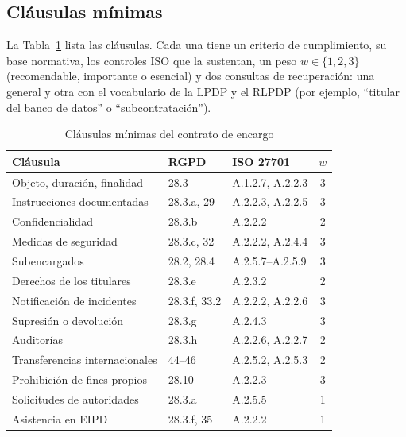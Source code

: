 \documentclass[conference]{IEEEtran}
\begin{document}
\subsection{Cláusulas mínimas}
La Tabla~\ref{tab:clausulas} lista las \NumClausulas{} cláusulas. Cada una tiene un criterio de cumplimiento, su base normativa, los controles ISO que la sustentan, un peso $w\in\{1,2,3\}$ (recomendable, importante o esencial) y dos consultas de recuperación: una general y otra con el vocabulario de la LPDP y el RLPDP (por ejemplo, ``titular del banco de datos'' o ``subcontratación'').

\begin{table}[t]
\centering
\caption{Cláusulas mínimas del contrato de encargo}
\label{tab:clausulas}
\scriptsize
\begin{tabular}{@{}p{}p{}p{}c@{}}
\toprule
Cláusula & RGPD & ISO 27701 & $w$ \\
\midrule
Objeto, duración, finalidad & 28.3 & A.1.2.7, A.2.2.3 & 3 \\
Instrucciones documentadas & 28.3.a, 29 & A.2.2.3, A.2.2.5 & 3 \\
Confidencialidad & 28.3.b & A.2.2.2 & 2 \\
Medidas de seguridad & 28.3.c, 32 & A.2.2.2, A.2.4.4 & 3 \\
Subencargados & 28.2, 28.4 & A.2.5.7--A.2.5.9 & 3 \\
Derechos de los titulares & 28.3.e & A.2.3.2 & 2 \\
Notificación de incidentes & 28.3.f, 33.2 & A.2.2.2, A.2.2.6 & 3 \\
Supresión o devolución & 28.3.g & A.2.4.3 & 3 \\
Auditorías & 28.3.h & A.2.2.6, A.2.2.7 & 2 \\
Transferencias internacionales & 44--46 & A.2.5.2, A.2.5.3 & 2 \\
Prohibición de fines propios & 28.10 & A.2.2.3 & 3 \\
Solicitudes de autoridades & 28.3.a & A.2.5.5 & 1 \\
Asistencia en EIPD & 28.3.f, 35 & A.2.2.2 & 1 \\
\bottomrule
\end{tabular}
\end{table}
\end{document}

